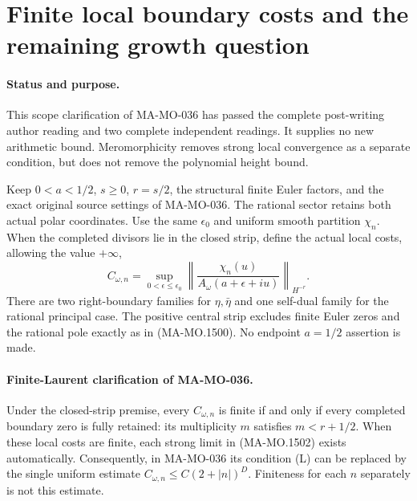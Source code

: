 \section{Finite local boundary costs and the remaining growth question}
\label{sec:local-boundary-cost-scope}

\paragraph{Status and purpose.}
This scope clarification of MA-MO-036 has passed the complete
post-writing author reading and two complete independent readings.
It supplies no new arithmetic bound.  Meromorphicity removes strong local
convergence as a separate condition, but does not remove the
polynomial height bound.

Keep $0<a<1/2$, $s\ge0$, $r=s/2$, the structural finite Euler
factors, and the exact original source settings of MA-MO-036.
The rational sector retains both actual polar coordinates.
Use the same $\epsilon_0$ and uniform smooth partition $\chi_n$.
When the completed divisors lie in the closed strip, define the
actual local costs, allowing the value $+\infty$,
\[
 C_{\omega,n}
   =\sup_{0<\epsilon\le\epsilon_0}
       \left\|\frac{\chi_n(u)}
                       {A_\omega(a+\epsilon+iu)}\right\|_{H^{-r}} .
 \tag{MA-MO.1528}
\]
There are two right-boundary families for $\eta,\bar\eta$ and
one self-dual family for the rational principal case.  The
positive central strip excludes finite Euler zeros and the
rational pole exactly as in (MA-MO.1500).  No endpoint
$a=1/2$ assertion is made.

\paragraph{Finite-Laurent clarification of MA-MO-036.}
Under the closed-strip premise, every $C_{\omega,n}$ is finite
if and only if every completed boundary zero is fully retained:
its multiplicity $m$ satisfies $m<r+1/2$.
When these local costs are finite, each strong limit in
(MA-MO.1502) exists automatically.
Consequently, in MA-MO-036 its condition (L) can be replaced by
the single uniform estimate
$C_{\omega,n}\le C(2+|n|)^D$.
Finiteness for each $n$ separately is not this estimate.

